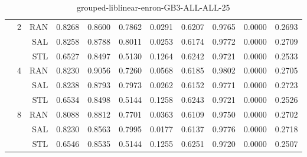 \begin{center}
\begin{table}[htbp]
\begin{tabular}{ | r | r | r | r | r | r | r | r | r | r | r |}
 & \multirow{3}{*}{2} & RAN & 0.8268 & 0.8600 & 0.7862 & 0.0291 & 0.6207 & 0.9765 & 0.0000 & 0.2693\\ \cline{3-11}
 &   & SAL & 0.8258 & 0.8788 & 0.8011 & 0.0253 & 0.6174 & 0.9772 & 0.0000 & 0.2709\\ \cline{3-11}
 &   & STL & 0.6527 & 0.8497 & 0.5130 & 0.1264 & 0.6242 & 0.9721 & 0.0000 & 0.2533\\ \cline{2-11}
 & \multirow{3}{*}{4} & RAN & 0.8230 & 0.9056 & 0.7260 & 0.0568 & 0.6185 & 0.9802 & 0.0000 & 0.2705\\ \cline{3-11}
 &   & SAL & 0.8238 & 0.8793 & 0.7973 & 0.0262 & 0.6152 & 0.9771 & 0.0000 & 0.2723\\ \cline{3-11}
 &   & STL & 0.6534 & 0.8498 & 0.5144 & 0.1258 & 0.6243 & 0.9721 & 0.0000 & 0.2526\\ \cline{2-11}
 & \multirow{3}{*}{8} & RAN & 0.8088 & 0.8812 & 0.7701 & 0.0363 & 0.6109 & 0.9750 & 0.0000 & 0.2702\\ \cline{3-11}
 &   & SAL & 0.8230 & 0.8563 & 0.7995 & 0.0177 & 0.6137 & 0.9776 & 0.0000 & 0.2718\\ \cline{3-11}
 &   & STL & 0.6546 & 0.8535 & 0.5144 & 0.1255 & 0.6251 & 0.9720 & 0.0000 & 0.2507\\ \cline{2-11}
\hline
\end{tabular}
\caption{grouped-liblinear-enron-GB3-ALL-ALL-25}
\end{table}
\end{center}

